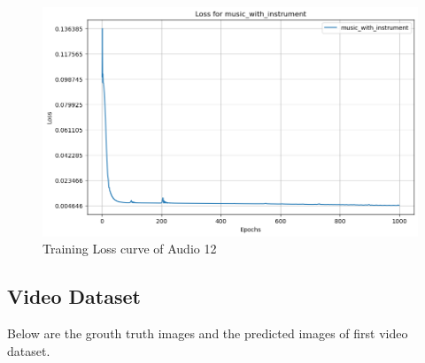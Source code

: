 \documentclass{ioereport}
\begin{document}
    \begin{figure}[H]
        \centering
        \includegraphics[width=\linewidth]{assets/audio_loss_curves/music_with_instrument.png}
        \caption{Training Loss curve of Audio 12}
        \label{fig:loss-curve-12}
    \end{figure}


    \subsection{Video Dataset}
    Below are the grouth truth images and the predicted images of first video dataset.
\end{document}
